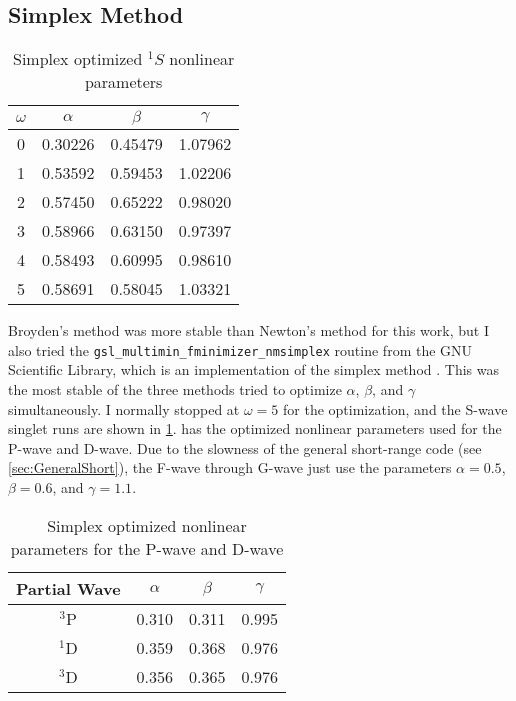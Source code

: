 \documentclass[Dissertation.tex]{subfiles}
\begin{document}
\subsection{Simplex Method}
\label{sec:Simplex}

\begin{table}
\centering
\begin{tabular}{c c c c}
\toprule
$\omega$ & $\alpha$ & $\beta$ & $\gamma$ \\ [0.5ex]
\midrule
0 & 0.30226 & 0.45479 & 1.07962 \\
1 & 0.53592 & 0.59453 & 1.02206 \\
2 & 0.57450 & 0.65222 & 0.98020 \\
3 & 0.58966 & 0.63150 & 0.97397 \\
4 & 0.58493 & 0.60995 & 0.98610 \\
5 & 0.58691 & 0.58045 & 1.03321 \\
\bottomrule
\end{tabular}
\caption{Simplex optimized $^1S$ nonlinear parameters}
\label{tab:NonlinearOptimized1SSimplex}
\end{table}

Broyden's method was more stable than Newton's method for this work, but I 
also tried the \texttt{gsl\_multimin\_fminimizer\_nmsimplex} routine from the 
GNU Scientific Library, which is an implementation of the simplex method
\cite{GSL,GSLsimplex}. This was the most stable of the three methods tried to 
optimize $\alpha$, $\beta$, and $\gamma$ simultaneously. I normally stopped 
at $\omega = 5$ for the optimization, and the S-wave singlet runs are shown 
in \cref{tab:NonlinearOptimized1SSimplex}.  
has the optimized nonlinear parameters used for the P-wave and D-wave. Due to 
the slowness of the general short-range code (see \cref{sec:GeneralShort}), 
the F-wave through G-wave just use the parameters $\alpha = 0.5$, $\beta = 0.6$,
and $\gamma = 1.1$.

\begin{table}
\small
\centering
\begin{tabular}{c c c c}
\toprule
Partial Wave & $\alpha$ & $\beta$ & $\gamma$ \\
\midrule
$^3$P & 0.310 & 0.311 & 0.995 \\
$^1$D & 0.359 & 0.368 & 0.976 \\
$^3$D & 0.356 & 0.365 & 0.976 \\
\bottomrule
\end{tabular}
\caption{Simplex optimized nonlinear parameters for the P-wave and D-wave}
\label{tab:NonlinearOptimizedPD}
\end{table}
\end{document}

